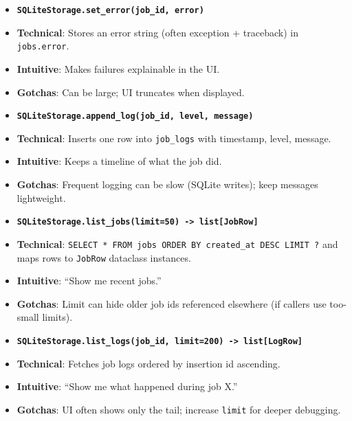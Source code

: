 \documentclass[11pt]{article}
\begin{document}
\begin{itemize}[leftmargin=*,nosep]
\item \textbf{\texttt{SQLiteStorage.set\_error(job\_id, error)}}
\item \textbf{Technical}: Stores an error string (often exception + traceback) in \texttt{jobs.error}.
\item \textbf{Intuitive}: Makes failures explainable in the UI.
\item \textbf{Gotchas}: Can be large; UI truncates when displayed.
\end{itemize}


\begin{itemize}[leftmargin=*,nosep]
\item \textbf{\texttt{SQLiteStorage.append\_log(job\_id, level, message)}}
\item \textbf{Technical}: Inserts one row into \texttt{job\_logs} with timestamp, level, message.
\item \textbf{Intuitive}: Keeps a timeline of what the job did.
\item \textbf{Gotchas}: Frequent logging can be slow (SQLite writes); keep messages lightweight.
\end{itemize}


\begin{itemize}[leftmargin=*,nosep]
\item \textbf{\texttt{SQLiteStorage.list\_jobs(limit=50) -> list[JobRow]}}
\item \textbf{Technical}: \texttt{SELECT * FROM jobs ORDER BY created\_at DESC LIMIT ?} and maps rows to \texttt{JobRow} dataclass instances.
\item \textbf{Intuitive}: “Show me recent jobs.”
\item \textbf{Gotchas}: Limit can hide older job ids referenced elsewhere (if callers use too-small limits).
\end{itemize}


\begin{itemize}[leftmargin=*,nosep]
\item \textbf{\texttt{SQLiteStorage.list\_logs(job\_id, limit=200) -> list[LogRow]}}
\item \textbf{Technical}: Fetches job logs ordered by insertion id ascending.
\item \textbf{Intuitive}: “Show me what happened during job X.”
\item \textbf{Gotchas}: UI often shows only the tail; increase \texttt{limit} for deeper debugging.
\end{itemize}
\end{document}
